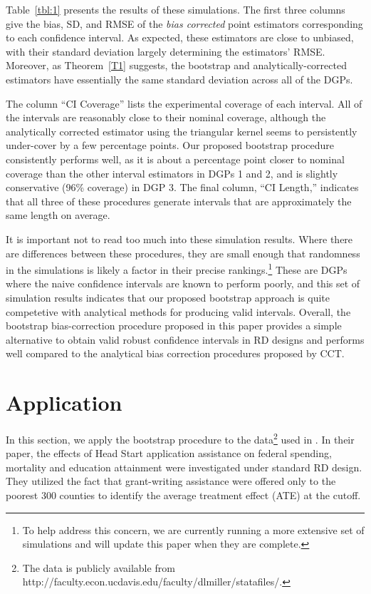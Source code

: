 \documentclass[12pt,fleqn]{article}
\begin{document}
Table~\ref{tbl:1} presents the results of these simulations. The first three
columns give the bias, SD, and RMSE of the \emph{bias corrected} point
estimators corresponding to each confidence interval.  As expected, these
estimators are close to unbiased, with their standard deviation largely
determining the estimators' RMSE. Moreover, as Theorem~\ref{T1} suggests, the
bootstrap and analytically-corrected estimators have essentially the same
standard deviation across all of the DGPs.

The column ``CI Coverage'' lists the experimental coverage of each interval.
All of the intervals are reasonably close to their nominal coverage, although
the analytically corrected estimator using the triangular kernel seems to
persistently under-cover by a few percentage points. Our proposed bootstrap
procedure consistently performs well, as it is about a percentage point closer
to nominal coverage than the other interval estimators in DGPs 1 and 2, and is
slightly conservative (96\% coverage) in DGP 3. The final column, ``CI Length,''
indicates that all three of these procedures generate intervals that are
approximately the same length on average.

It is important not to read too much into these simulation results. Where there
are differences between these procedures, they are small enough that randomness
in the simulations is likely a factor in their precise rankings.\footnote{%
  To help address this concern, we are currently running a more extensive set of
  simulations and will update this paper when they are complete.} %
These are DGPs where the naive confidence intervals are known to perform poorly,
and this set of simulation results indicates that our proposed bootstrap approach
is quite competetive with analytical methods for producing valid intervals.
Overall, the bootstrap bias-correction procedure proposed in this paper provides
a simple alternative to obtain valid robust confidence intervals in RD designs
and performs well compared to the analytical bias correction procedures proposed
by CCT.

\section{Application}\label{application}

In this section, we apply the bootstrap procedure to the data\footnote{The data is publicly available from http://faculty.econ.ucdavis.edu/faculty/dlmiller/statafiles/.} used in \cite{ludwig2007}. In their paper, the effects of Head Start application assistance on federal spending, mortality and education attainment were investigated under standard RD design. They utilized the fact that grant-writing assistance were offered only to the poorest 300 counties to identify the average treatment effect (ATE) at the cutoff.
\end{document}
